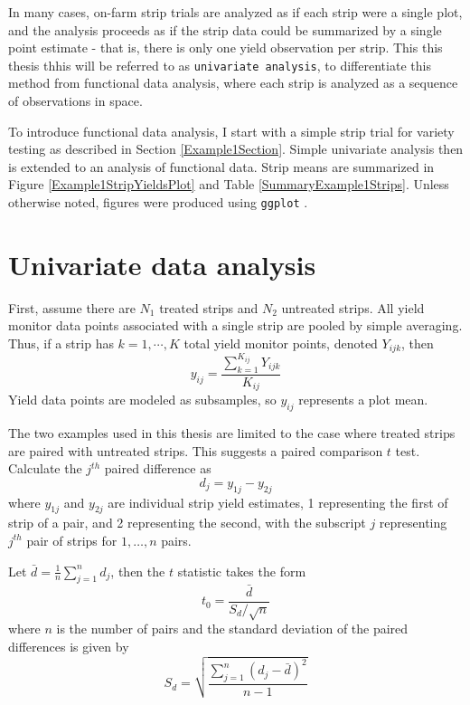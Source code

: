 \documentclass[phdcss]{SDSUThesis}
\begin{document}
In many cases, on-farm strip trials are analyzed as if each strip were a single plot, and the analysis proceeds as if the strip data could be summarized by a single point estimate - that is, there is only one yield observation per strip. This this thesis thhis will be referred to as \texttt{univariate analysis}, to differentiate this method from functional data analysis, where each strip is analyzed as a sequence of observations in space.

To introduce functional data analysis, I start with a simple strip trial for variety testing as described in Section \ref{Example1Section}. Simple univariate analysis then is extended to an analysis of functional data. Strip means are summarized in Figure \ref{Example1StripYieldsPlot} and Table \ref{SummaryExample1Strips}. Unless otherwise noted, figures were produced using \texttt{ggplot} \cite{wickham-2016}.

\section{Univariate data analysis}\label{UnivariateDataAnalysis}

First, assume there are $N_1$ treated strips and $N_2$ untreated strips. All yield monitor data points associated with a single strip are pooled by simple averaging. Thus, if a strip has $k=1,\cdots,K$ total yield monitor points, denoted  $Y_{ijk}$, then
\begin{equation}
y_{ij} = \frac{\sum_{k=1}^{K_{ij}} Y_{ijk}}{K_{ij}}
\end{equation}
Yield data points are modeled as subsamples, so $y_{ij}$ represents a plot mean.

The two examples used in this thesis are limited to the case where treated strips are paired with untreated strips. This suggests a paired comparison $t$ test. Calculate the $j^{th}$ paired difference as
\begin{equation}
d_j = y_{1j} - y_{2j}
\end{equation}
where $y_{1j}$ and $y_{2j}$ are individual strip yield estimates, 1 representing the first of strip of a pair, and 2 representing the second, with the subscript $j$ representing $j^{th}$ pair of strips for $1,\dots,n$ pairs.

Let $\bar{d} = \frac{1}{n} \sum_{j=1}^n d_j$, then the $t$ statistic takes the form
\begin{equation}
t_0 = \frac{\bar{d}}{S_d/\sqrt{n}}
\end{equation}
where $n$ is the number of pairs and the standard deviation of the paired differences is given by
\begin{equation}
S_d = \sqrt{\frac{\sum_{j=1}^n (d_j - \bar{d})^2}{n-1}}
\end{equation}
\end{document}
